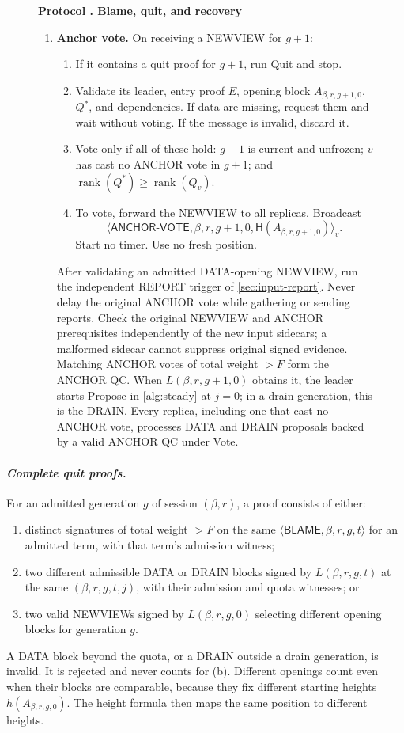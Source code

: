 \documentclass[11pt,a4paper]{article}
\newcommand{\RR}[1]{{\color{rrRed}#1}}
\newcommand{\Hash}{\mathsf H}
\newcommand{\rank}{\operatorname{rank}}
\newcommand{\tagg}[1]{\ensuremath{\mathsf{#1}}}
\newcommand{\defterm}[1]{\textcolor{rrBlue}{\textit{#1}}}
\newcounter{protocol}
\newenvironment{protocol}[3][htbp]{\begin{figure}[#1]\refstepcounter{protocol}\label{#2}
\begin{mdframed}[linewidth=.6pt,skipabove=0pt,skipbelow=0pt,
innertopmargin=7pt,innerbottommargin=7pt]\small
\textbf{Protocol \theprotocol. #3}\par\smallskip}{\end{mdframed}\end{figure}}
\begin{document}
\begin{protocol}{alg:recovery}{Blame, quit, and recovery}
\begin{enumerate}[label=\textbf{\arabic*)},itemsep=3pt]
\item \textbf{Anchor vote.} On receiving a NEWVIEW for $g+1$:
 \begin{enumerate}[label=(\alph*)]
 \item If it contains a quit proof for $g+1$, run Quit and stop.
 \item Validate its leader, entry proof $E$, opening block $A_{\beta,r,g+1,0}$,
       $Q^*$, and dependencies. If data are missing, request them and
       wait without voting. If the message is invalid, discard it.
 \item Vote only if all of these hold: $g+1$ is current and unfrozen; $v$
       has cast no ANCHOR vote in $g+1$; and $\rank(Q^*)\ge\rank(Q_v)$.
 \item To vote, forward the NEWVIEW to all replicas. Broadcast
       \[\langle\tagg{ANCHOR\mbox{-}VOTE},\beta,r,g+1,0,\Hash(A_{\beta,r,g+1,0})\rangle_v.\]
       Start no timer. Use no fresh position.
 \end{enumerate}
 After validating an admitted DATA-opening NEWVIEW, run the independent
 REPORT trigger of \cref{sec:input-report}. Never delay the original
 ANCHOR vote while gathering or sending reports. Check the original
 NEWVIEW and ANCHOR prerequisites independently of the new input
 sidecars; a malformed sidecar cannot suppress original signed evidence.
 Matching ANCHOR votes \RR{of total weight $>F$} form the ANCHOR QC.
 When $L(\beta,r,g+1,0)$ obtains it, the leader starts Propose in
 \cref{alg:steady} at $j=0$\RR{; in a drain generation, this is the
 DRAIN}. Every replica, including one that cast no ANCHOR vote,
 processes DATA \RR{and DRAIN} proposals backed by a valid ANCHOR QC
 under Vote.
\end{enumerate}
\end{protocol}

\paragraph{\defterm{Complete quit proofs.}}
For an admitted generation $g$ \RR{of session $(\beta,r)$}, a proof consists of
either:
\begin{enumerate}[label=(\alph*)]
\item distinct signatures \RR{of total weight $>F$} on the same
$\langle\tagg{BLAME},\beta,r,g,t\rangle$ for an admitted term, with that term's
admission witness;
\item two different admissible DATA \RR{or DRAIN} blocks signed by
$L(\beta,r,g,t)$ at the same $(\beta,r,g,t,j)$, with their admission \RR{and quota}
witnesses; or
\item two valid NEWVIEWs signed by $L(\beta,r,g,0)$ selecting different opening
blocks for generation $g$.
\end{enumerate}
\RR{A DATA block beyond the quota, or a DRAIN outside a drain generation,
is invalid. It is rejected and never counts for (b).}
Different openings count even when their blocks are comparable, because
they fix different starting heights $h(A_{\beta,r,g,0})$. The height formula then
maps the same position to different heights.
\end{document}
